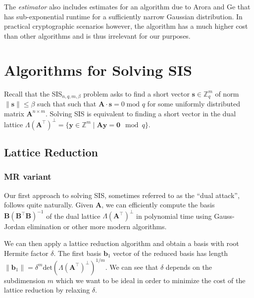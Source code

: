 The \textit{estimator} also includes estimates for an algorithm due to Arora and Ge \cite{AG11} that has sub-exponential runtime for a sufficiently narrow Gaussian distribution. In practical cryptographic scenarios however, the algorithm has a much higher cost than other algorithms and is thus irrelevant for our purposes.


\section{Algorithms for Solving SIS}
Recall that the SIS$_{n, q, m, \beta}$ problem asks to find a short vector $\mathbf{s} \in \mathbb{Z}_q^m$ of norm $\|\mathbf{s}\| \leq \beta$ such that such that $\mathbf{A} \cdot \mathbf{s} = 0 \; \text{mod } q$ for some uniformly distributed matrix $\mathbf{A}^{n\times m}$. Solving SIS is equivalent to finding a short vector in the dual lattice $\Lambda(\mathbf{A}^\intercal)^{\perp} = \{ \mathbf{y} \in \mathbb{Z}^m \mid \mathbf{A} \mathbf{y} = \mathbf{0} \mod q\}$.


\subsection{Lattice Reduction}\label{sec:dual-attack}
\subsubsection{MR variant \cite{MR09}} \label{sec:mr-variant}
Our first approach to solving SIS, sometimes referred to as the ``dual attack'', follows quite naturally. Given $\mathbf{A}$, we can efficiently compute the basis $\mathbf{B} (\mathbf{B}^\intercal \mathbf{B})^{-1}$ of the dual lattice $\Lambda(\mathbf{A}^\intercal)^{\perp}$ in polynomial time using Gauss-Jordan elimination or other more modern algorithms.

We can then apply a lattice reduction algorithm and obtain a basis with root Hermite factor $\delta$. The first basis $\mathbf{b}_1$ vector of the reduced basis has length $\|\mathbf{b}_1\| = \delta^m \text{det}(\Lambda(\mathbf{A}^\intercal)^{\perp})^{1/m}$. We can see that $\delta$ depends on the subdimension $m$ which we want to be ideal in order to minimize the cost of the lattice reduction by relaxing $\delta$.

